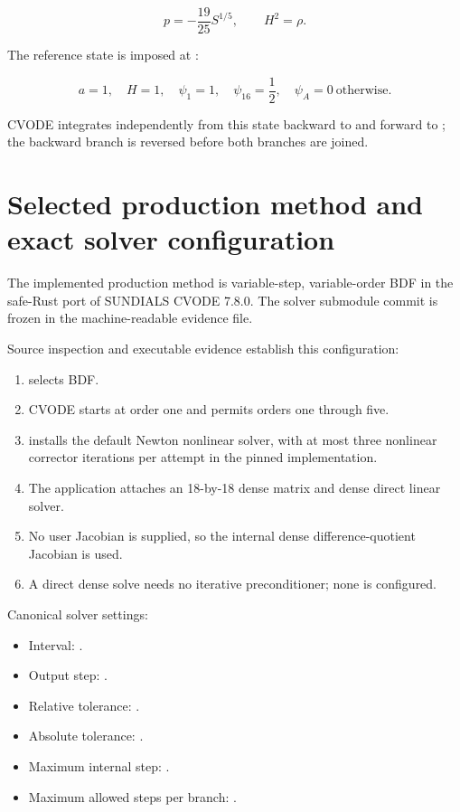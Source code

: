 \documentclass[11pt]{article}
\begin{document}
\[
p=-\frac{19}{25}S^{1/5},
\qquad H^2=\rho.
\]

The reference state is imposed at \texttt{}:

\[
a=1,
\quad H=1,
\quad \psi_1=1,
\quad \psi_{16}=\frac12,
\quad \psi_A=0\ \text{otherwise}.
\]

CVODE integrates independently from this state backward to \texttt{} and forward to \texttt{}; the backward branch is reversed before both branches are joined.

\section{Selected production method and exact solver configuration}

The implemented production method is variable-step, variable-order BDF in the safe-Rust port of SUNDIALS CVODE 7.8.0. The solver submodule commit is frozen in the machine-readable evidence file.

Source inspection and executable evidence establish this configuration:

\begin{enumerate}
\item \texttt{} selects BDF.
\item CVODE starts at order one and permits orders one through five.
\item \texttt{} installs the default Newton nonlinear solver, with at most three
nonlinear corrector iterations per attempt in the pinned implementation.

\item The application attaches an 18-by-18 dense matrix and dense direct linear
solver.

\item No user Jacobian is supplied, so the internal dense difference-quotient
Jacobian is used.

\item A direct dense solve needs no iterative preconditioner; none is configured.
\end{enumerate}

Canonical solver settings:

\begin{itemize}
\item Interval: \texttt{}.
\item Output step: \texttt{}.
\item Relative tolerance: \texttt{}.
\item Absolute tolerance: \texttt{}.
\item Maximum internal step: \texttt{}.
\item Maximum allowed steps per branch: \texttt{}.
\end{itemize}
\end{document}

